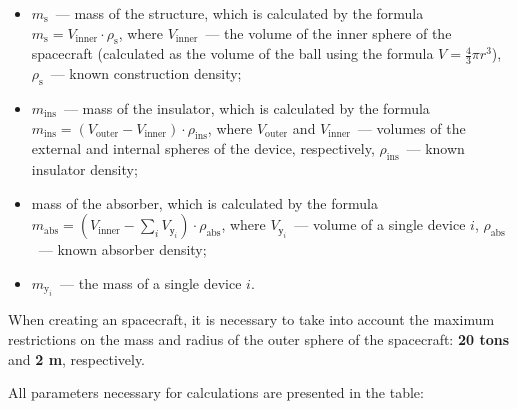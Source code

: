 \documentclass[12pt,a4paper]{article}
\begin{document}
\begin{itemize}
   \item $m_{\text{s}}$~--- mass of the structure, which is calculated by the formula $m_{\text{s}} = V_{\text{inner}} \cdot \rho_{\text{s}}$, where $V_{\text{inner}}$~--- the volume of the inner sphere of the spacecraft (calculated as the volume of the ball using the formula $V = \frac{4}{3} \pi r^3$), $ \rho_{\text{s}}$~--- known construction density;
   \item $m_{\text{ins}}$~--- mass of the insulator, which is calculated by the formula $m_{\text{ins}} = (V_{\text{outer}} - V_{\text{inner} }) \cdot \rho_{\text{ins}}$, where $V_{\text{outer}}$ and $V_{\text{inner}}$~--- volumes of the external and internal spheres of the device, respectively, $ \rho_{\text{ins}}$~--- known insulator density;
   \item mass of the absorber, which is calculated by the formula $m_{\text{abs}} =
      \left(V_{\text{inner}} - \sum\limits_{i}V_{\text{у}_i}\right)\cdot \rho_{\text{abs}}$, where $V_{\text{у}_i}$~--- volume of a single device $i$,
       $\rho_{\text{abs}}$~--- known absorber density;
   \item $m_{\text{y}_i}$~--- the mass of a single device $i$.
\end{itemize}

When creating an spacecraft, it is necessary to take into account the maximum restrictions on the mass and radius of the outer sphere of the spacecraft: \textbf{20 tons} and \textbf{2 m}, respectively.

All parameters necessary for calculations are presented in the table:
\end{document}
